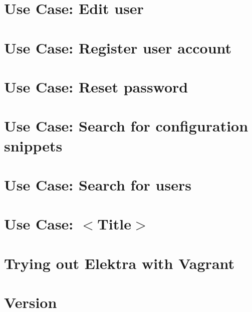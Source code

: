 \documentclass[twoside]{book}
\newcommand{\+}{\discretionary{\mbox{\scriptsize$\hookleftarrow$}}{}{}}
\begin{document}
\chapter{Use Case\+: Edit user}
\label{doc_usecases_snippet_sharing_UC_edit_user_md}

\chapter{Use Case\+: Register user account}
\label{doc_usecases_snippet_sharing_UC_register_md}

\chapter{Use Case\+: Reset password}
\label{doc_usecases_snippet_sharing_UC_reset_password_md}

\chapter{Use Case\+: Search for configuration snippets}
\label{doc_usecases_snippet_sharing_UC_search_snippet_md}

\chapter{Use Case\+: Search for users}
\label{doc_usecases_snippet_sharing_UC_search_user_md}

\chapter{Use Case\+: $<$Title$>$}
\label{doc_usecases_template_md}

\chapter{Trying out Elektra with Vagrant}
\label{doc_vagrant_README_md}

\chapter{Version}
\label{doc_VERSION_md}

\end{document}
